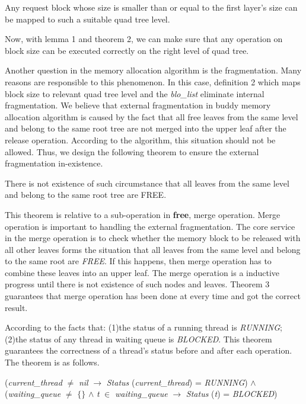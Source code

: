 \documentclass[runningheads]{llncs}
\begin{document}
\begin{theorem}
Any request block whose size is smaller than or equal to the first layer's size can be mapped to such a suitable quad tree level.
\end{theorem}

Now, with lemma 1 and theorem 2, we can make sure that any operation on block size can be executed correctly on the right level of quad tree.

Another question in the memory allocation algorithm is the fragmentation. Many reasons are responsible to this phenomenon. In this case, definition 2 which maps block size to relevant quad tree level and the \textsl{blo\_list} eliminate internal fragmentation. We believe that external fragmentation in buddy memory allocation algorithm is caused by the fact that all free leaves from the same level and belong to the same root tree are not merged into the upper leaf after the release operation. According to the algorithm, this situation should not be allowed. Thus, we design the following theorem to ensure the external fragmentation in-existence.

\begin{theorem}
There is not existence of such circumstance that all leaves from the same level and belong to the same root tree are FREE.
\end{theorem}

This theorem is relative to a sub-operation in \textbf{free}, merge operation. Merge operation is important to handling the external fragmentation. The core service in the merge operation is to check whether the memory block to be released with all other leaves forms the situation that all leaves from the same level and belong to the same root are \textsl{FREE}. If this happens, then merge operation has to combine these leaves into an upper leaf. The merge operation is a inductive progress until there is not existence of such nodes and leaves. Theorem 3 guarantees that merge operation has been done at every time and got the correct result.

According to the facts that: (1)the status of a running thread is \textsl{RUNNING}; (2)the status of any thread in waiting queue is \textsl{BLOCKED}. This theorem guarantees the correctness of a thread's status before and after each operation. The theorem is as follows.

\begin{theorem}
(\textsl{current\_thread} $\neq$ \textsl{nil} $\longrightarrow$ \textsl{Status} (\textsl{current\_thread}) = \textsl{RUNNING}) $\wedge$ (\textsl{waiting\_queue} $\neq$ $\lbrace$$\rbrace$ $\wedge$ \textsl{t} $\in$ \textsl{waiting\_queue} $\longrightarrow$ \textsl{Status} (\textsl{t}) = \textsl{BLOCKED})
\end{theorem}
\end{document}
